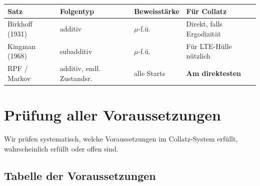 \documentclass[12pt,a4paper]{article}
\begin{document}
\begin{center}
\renewcommand{\arraystretch}{1.4}
\begin{tabular}{>{\raggedright}p{3.2cm}
                >{\centering}p{2.6cm}
                >{\centering}p{2.6cm}
                >{\raggedright\arraybackslash}p{4.2cm}}
\toprule
\textbf{Satz} & \textbf{Folgentyp} & \textbf{Beweisstärke} & \textbf{Für Collatz} \\
\midrule
Birkhoff (1931) & additiv & $\mu$-f.ü. & Direkt, falls Ergodizität \\
Kingman (1968) & subadditiv & $\mu$-f.ü. & Für LTE-Hülle nützlich \\
RPF / Markov & additiv, endl. Zustandsr. & alle Starts & \textbf{Am direktesten} \\
\bottomrule
\end{tabular}
\end{center}

\section{Prüfung aller Voraussetzungen}
\label{sec:voraussetzungen}

Wir prüfen systematisch, welche Voraussetzungen im Collatz-System
erfüllt, wahrscheinlich erfüllt oder offen sind.

\subsection{Tabelle der Voraussetzungen}
\end{document}
